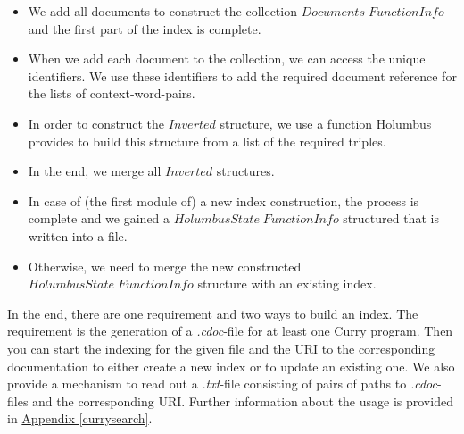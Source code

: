 \documentclass[%
	latex,%
	a4paper,%
	oneside,%
	chapterprefix,%
	headsepline,%
	12pt%
]{scrbook}
\newcommand{\Conid}[1]{\mathit{#1}}
\begin{document}
\begin{itemize}
\item We add all documents to construct the collection \ensuremath{\Conid{Documents}\;\Conid{FunctionInfo}} and the first part of the index is complete. %

\item When we add each document to the collection, we can access the
  unique identifiers. %
  We use these identifiers to add the required document reference for
  the lists of context-word-pairs. %

\item In order to construct the \ensuremath{\Conid{Inverted}} structure, we use a
  function Holumbus provides to build this structure from a list of
  the required triples. %

\item In the end, we merge all \ensuremath{\Conid{Inverted}} structures.

\item In case of (the first module of) a new index construction, the
  process is complete and we gained a \ensuremath{\Conid{HolumbusState}\;\Conid{FunctionInfo}}
  structured that is written into a file. %

\item Otherwise, we need to merge the new constructed \ensuremath{\Conid{HolumbusState}\;\Conid{FunctionInfo}} structure with an existing index. %
\end{itemize}

\todo[inline]{}
In the end, there are one requirement and two ways to build an index. %
The requirement is the generation of a \emph{.cdoc}-file for at least
one Curry program. %
Then you can start the indexing for the given file and the URI to the
corresponding documentation to either create a new index or to update
an existing one. %
We also provide a mechanism to read out a \emph{.txt}-file consisting
of pairs of paths to \emph{.cdoc}-files and the corresponding URI. %
Further information about the usage is provided in
\hyperref[currysearch]{Appendix \ref{currysearch}}. %


\end{document}
